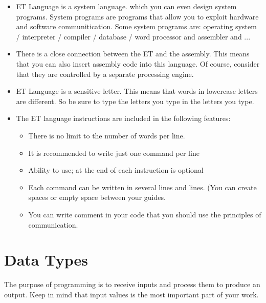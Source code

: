 \documentclass[11pt,fleqn]{book}
\begin{document}
\begin{itemize}
\begin{table}[]
\begin{tabular}{|lllll|}
    \end{tabular}
\end{table}


\pagebreak

    
    
    \item ET Language is a system language. which you can even design system programs. System programs are programs that allow you to exploit hardware and software communitication. Some system programs are: operating system / interpreter / compiler / database / word processor and assembler and ...
    
    \item There is a close connection between the ET and the assembly.
    This means that you can also insert assembly code into this language.
    Of course, consider that they are controlled by a separate processing engine.
    
    \item ET Language is a sensitive letter.
    This means that words in lowercase letters are different.
    So be sure to type the letters you type in the letters you type.
    
    \item The ET language instructions are included in the following features:
    
    \begin{itemize}
    \item There is no limit to the number of words per line.
    \item It is recommended to write just one command per line
    \item Ability to use; at the end of each instruction is optional
    \item Each command can be written in several lines and lines. (You can create spaces or empty space between your guides.

\item You can write comment in your code that you should use the principles of communication.   
    \end{itemize}

    

\end{itemize}




\section{Data Types}


The purpose of programming is to receive inputs and process them to produce an output.
Keep in mind that input values is the most important part of your work.
\end{document}
